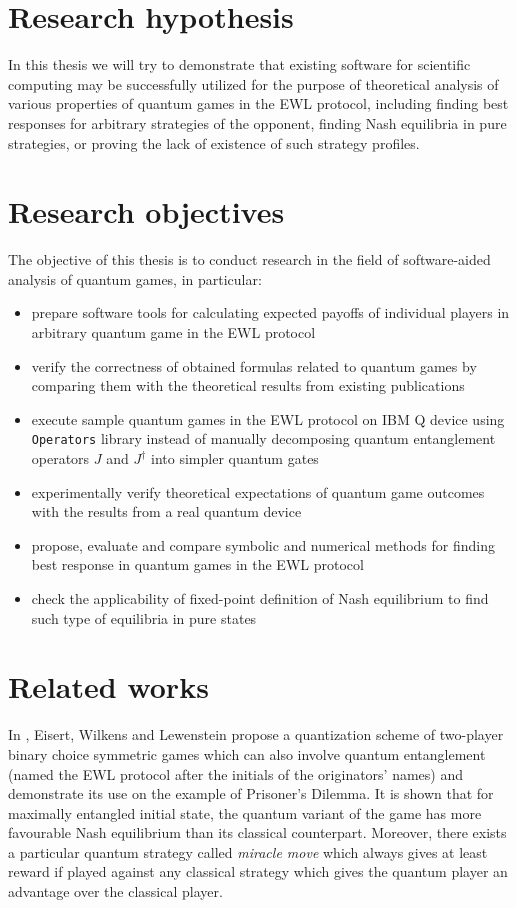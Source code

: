 \documentclass[../main.tex]{subfiles}
\begin{document}
\section{Research hypothesis}

In this thesis we will try to demonstrate that existing software for scientific computing may be successfully utilized for the purpose of theoretical analysis of various properties of quantum games in the EWL protocol, including finding best responses for arbitrary strategies of the opponent, finding Nash equilibria in pure strategies, or proving the lack of existence of such strategy profiles.

\section{Research objectives}

The objective of this thesis is to conduct research in the field of software-aided analysis of quantum games, in particular:
\begin{itemize}
\setlength\itemsep{0.05em}
    \item prepare software tools for calculating expected payoffs of individual players in arbitrary quantum game in the EWL protocol
    \item verify the correctness of obtained formulas related to quantum games by comparing them with the theoretical results from existing publications
    \item execute sample quantum games in the EWL protocol on IBM Q device using \texttt{Operators} library instead of manually decomposing quantum entanglement operators $J$ and $J^\dag$ into simpler quantum gates
    \item experimentally verify theoretical expectations of quantum game outcomes with the results from a real quantum device
    \item propose, evaluate and compare symbolic and numerical methods for finding best response in quantum games in the EWL protocol
    \item check the applicability of fixed-point definition of Nash equilibrium to find such type of equilibria in pure states
\end{itemize}

\clearpage
\section{Related works}

In \cite{eisert1999quantum}, Eisert, Wilkens and Lewenstein propose a quantization scheme of two-player binary choice symmetric games which can also involve quantum entanglement (named the EWL protocol after the initials of the originators' names) and demonstrate its use on the example of Prisoner's Dilemma. It is shown that for maximally entangled initial state, the quantum variant of the game has more favourable Nash equilibrium than its classical counterpart. Moreover, there exists a particular quantum strategy called \emph{miracle move} which always gives at least reward if played against any classical strategy which gives the quantum player an advantage over the classical player.
\end{document}
